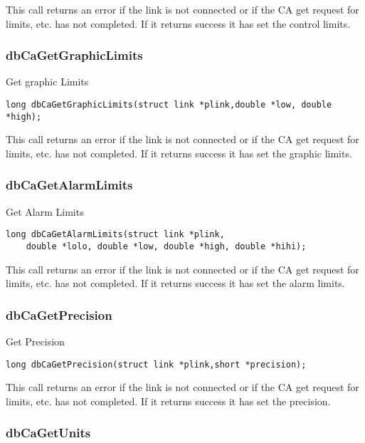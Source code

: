This call returns an error if the link is not connected or if the CA get request for limits, etc. has not completed.
If it returns success it has set the control limits.

\subsubsection{dbCaGetGraphicLimits}

Get graphic Limits

\begin{verbatim}
long dbCaGetGraphicLimits(struct link *plink,double *low, double *high);
\end{verbatim}

This call returns an error if the link is not connected or if the CA get request for limits, etc. has not completed.
If it returns success it has set the graphic limits.

\subsubsection{dbCaGetAlarmLimits}

Get Alarm Limits

\begin{verbatim}
long dbCaGetAlarmLimits(struct link *plink,
    double *lolo, double *low, double *high, double *hihi);
\end{verbatim}

This call returns an error if the link is not connected or if the CA get request for limits, etc. has not completed.
If it returns success it has set the alarm limits.

\subsubsection{dbCaGetPrecision}

Get Precision

\begin{verbatim}
long dbCaGetPrecision(struct link *plink,short *precision);
\end{verbatim}

This call returns an error if the link is not connected or if the CA get request for limits, etc. has not completed.
If it returns success it has set the precision.

\subsubsection{dbCaGetUnits}

